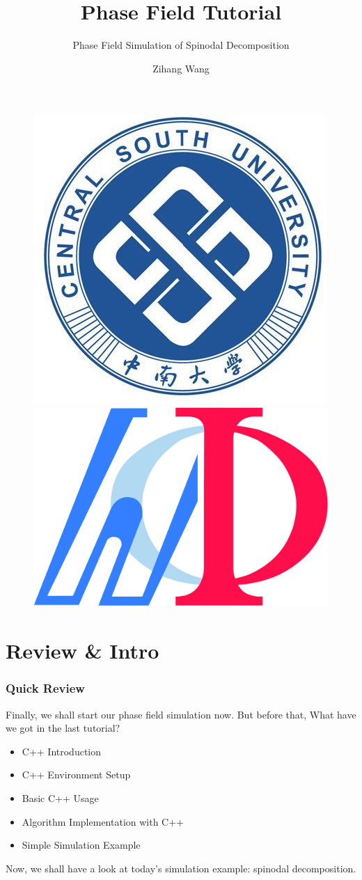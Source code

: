 \documentclass[compress,xcolor={dvipsnames}]{beamer}
\author{Zihang Wang}
\title{Phase Field Tutorial}
\subtitle{Phase Field Simulation of Spinodal Decomposition}
\institute{Central South University}
\begin{document}
\begin{frame}
    \titlepage
    \begin{figure}[!h]
        \centering
        \includegraphics[width=0.18\linewidth]{pic/csulogo.jpg}
        \includegraphics[width=0.25\linewidth]{pic/MInDes_Icon.jpg}
    \end{figure}
\end{frame}

\begin{frame}
    \tableofcontents[currentsection, hideothersubsections, sectionstyle=show/show]
\end{frame}

\section{Review \& Intro}
\begin{frame}
    \frametitle{Quick Review}
    Finally, we shall start our phase field simulation now. But before that, What have we got in the last tutorial?

    \begin{itemize}
        \item C++ Introduction
        \item C++ Environment Setup
        \item Basic C++ Usage
        \item Algorithm Implementation with C++
        \item Simple Simulation Example
    \end{itemize}

    Now, we shall have a look at today's simulation example: spinodal decomposition.

\end{frame}
\end{document}
